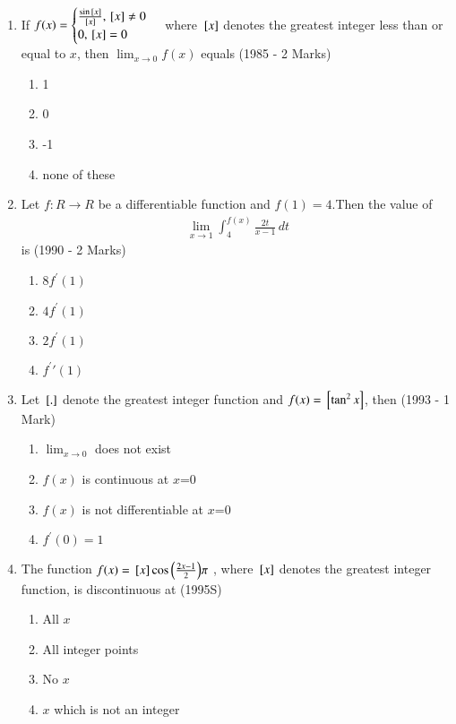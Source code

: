 \documentclass[journal,12pt,onecolumn]{IEEEtran}
\theoremstyle{remark}
\begin{document}
\begin{enumerate}
\begin{enumerate}
                 \end{enumerate}

\item If $f(x)=\begin{cases}
\frac{\sin{}\left[x\right]}{{}\left[x\right]}, {}\left[x\right]\neq 0\\ 0 ,  {}\left[x\right]=0\end{cases}$   where ${}\left[x\right]$ denotes the greatest integer less than or equal to $x$, then $\lim_{x\to 0}f(x)$ equals
    \hfill                (1985 - 2 Marks)
    \begin{enumerate}
        \item 1
        \item 0
        \item -1
        \item none of these
    \end{enumerate}

\item Let $f:R\to R$ be a differentiable function and $f(1)=4$.Then the value of
\begin{align}
 \: \lim_{x\to 1}\int_{4}^{f(x)}\frac{2t}{x-1}\,dt 
 \end{align}
 is
\hfill(1990 - 2 Marks)
 \begin{enumerate}
     \item 8$f^{\prime}(1)$
     \item $4f^{\prime}(1)$
     \item $2f^{\prime}(1)$
     \item $f^{\prime}{\prime}(1)$
     
     
 \end{enumerate}

\item Let ${}\left[.\right]$ denote the greatest integer function and $f(x)={}\left[\tan^2{x}\right]$, then
\hfill(1993 - 1 Mark)
    \begin{enumerate}
        \item $\lim_{x\to 0}$ does not exist
        \item $f(x)$ is continuous at $x$=0
        \item $f(x)$ is not differentiable at $x$=0
        \item $f^{\prime}(0)=1$
        
    \end{enumerate}

\item The function $f(x)={}\left[x\right]\cos{\ensuremath{\left(\frac{2x-1}{2}\right)}}\pi$ , where ${}\left[x\right]$ denotes the greatest integer function, is discontinuous at
\hfill(1995S)
   \begin{enumerate}
       \item All $x$
       \item All integer points
       \item No $x$
       \item $x$ which is not an integer
   \end{enumerate}


\end{enumerate}
\end{document}
